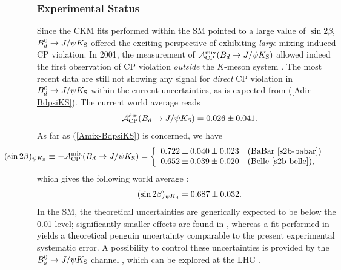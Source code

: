 \documentclass[11pt]{cernrep}
\begin{document}
\subsubsection{Experimental Status}
%
%
%
Since the CKM fits performed within the SM pointed to a large value of 
$\sin2\beta$, $B^0_d\to J/\psi K_{\rm S}$ offered the exciting perspective 
of exhibiting {\it large} mixing-induced CP violation. In 2001, the measurement of  
${\cal A}^{\mbox{{\scriptsize mix}}}_{\mbox{{\scriptsize CP}}}
(B_d\to J/\psi K_{\mbox{{\scriptsize S}}})$
allowed indeed the first observation of CP violation {\it outside} the 
$K$-meson system \cite{CP-B-obs}.
The most recent data are still not showing any signal for {\it direct} CP violation
in $B^0_d\to J/\psi K_{\rm S}$ within the current uncertainties, as is expected from 
(\ref{Adir-BdpsiKS}). The current world average reads \cite{HFAG}
\begin{equation}
{\cal A}_{\rm CP}^{\rm dir}(B_d\to J/\psi K_{\rm S})=0.026\pm0.041.
\end{equation}
As far as (\ref{Amix-BdpsiKS}) is concerned, we have
\begin{equation}\label{s2b-psiK-exp}
\hspace*{-2.0truecm}(\sin2\beta)_{\psi K_{\rm S}}\equiv 
-{\cal A}^{\mbox{{\scriptsize mix}}}_{\mbox{{\scriptsize
CP}}}(B_d\to J/\psi K_{\mbox{{\scriptsize S}}})
=\left\{
\begin{array}{ll}
0.722\pm0.040\pm0.023 & \mbox{(BaBar \cite{s2b-babar})}\\
0.652\pm0.039\pm0.020 & \mbox{(Belle \cite{s2b-belle}),}
\end{array}
\right.
\end{equation}
which gives the following world average \cite{HFAG}:
\begin{equation}\label{s2b-average}
(\sin 2\beta)_{\psi K_{\rm S}}=0.687\pm0.032.
\end{equation}
In the SM, the theoretical uncertainties are generically expected to be
below the 0.01 level; significantly smaller effects are found in \cite{BMR}, 
whereas a fit performed in \cite{CPS} yields a theoretical penguin uncertainty 
comparable to the present experimental systematic error. A possibility
to control these uncertainties is provided by the $B^0_s\to J/\psi K_{\rm S}$ 
channel \cite{RF-BdsPsiK}, which can be explored at the LHC \cite{LHC-Book}.
\end{document}

